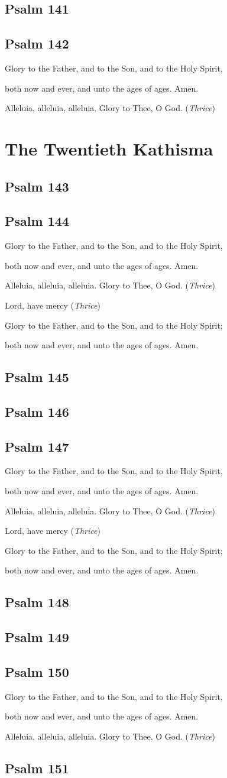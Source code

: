 \documentclass[12pt,openany]{book}
\newcommand{\kathismabreak}{
  \medskip
  \begin{center}
  \begin{footnotesize}
  Glory to the Father, and to the Son, and to the Holy Spirit,
  
  both now and ever, and unto the ages of ages. Amen.

  Alleluia, alleluia, alleluia. Glory to Thee, O God. (\textit{Thrice})

  Lord, have mercy (\textit{Thrice})

  Glory to the Father, and to the Son, and to the Holy Spirit;
  
  both now and ever, and unto the ages of ages. Amen.
  \end{footnotesize}
  \end{center}
  \smallbreak
}
\newcommand{\kathismaend}{
  \medskip
  \begin{center}
  \begin{footnotesize}
  Glory to the Father, and to the Son, and to the Holy Spirit,
  
  both now and ever, and unto the ages of ages. Amen.

  Alleluia, alleluia, alleluia. Glory to Thee, O God. (\textit{Thrice})
  \end{footnotesize}
  \end{center}
  \smallbreak
}
\begin{document}
\section{Psalm 141}

\smallskip
\section{Psalm 142}


\kathismaend

\chapter*{The Twentieth Kathisma}
\smallskip
\section{Psalm 143}

\smallskip
\section{Psalm 144}


\kathismabreak
\bigskip
\section{Psalm 145}

\smallskip
\pagebreak %
\section{Psalm 146}

\smallskip
\section{Psalm 147}


\kathismabreak
\smallskip
\section{Psalm 148}

\smallskip
\section{Psalm 149}

\smallskip
\section{Psalm 150}


\kathismaend
\smallskip
\section{Psalm 151}


\newpage

\thispagestyle{empty}
\ %

\newpage

\newpage
\pagestyle{plain}
\tableofcontents
\end{document}
